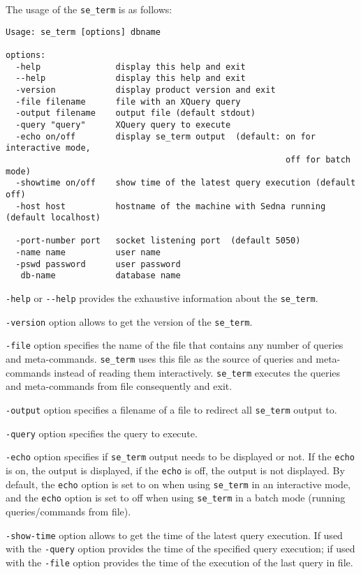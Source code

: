 \documentclass[a4paper,12pt]{article}
\begin{document}
The usage of the \verb!se_term! is as follows:

\begin{verbatim}
Usage: se_term [options] dbname

options:
  -help			      display this help and exit
  --help		      display this help and exit
  -version		      display product version and exit
  -file filename	  file with an XQuery query			  
  -output filename	  output file (default stdout)
  -query "query"	  XQuery query to execute		
  -echo on/off		  display se_term output  (default: on for interactive mode,
                                                        off for batch mode)
  -showtime on/off	  show time of the latest query execution (default off)
  -host host		  hostname of the machine with Sedna running (default localhost)
		
  -port-number port	  socket listening port  (default 5050)
  -name name		  user name 
  -pswd password	  user password 
   db-name		      database name
\end{verbatim}

\verb!-help! or \verb!--help! provides the exhaustive information about the \verb!se_term!.

\verb!-version! option allows to get the version of the \verb!se_term!.

\verb!-file! option specifies the name of the file that contains any number of queries and meta-commands. \verb!se_term! uses this file as the source of queries and meta-commands instead of reading them interactively. \verb!se_term! executes the queries and meta-commands from file consequently and exit.

\verb!-output! option specifies a filename of a file to redirect all \verb!se_term! output to. 

\verb!-query! option specifies the query to execute.

\verb!-echo! option specifies if \verb!se_term! output needs to be displayed or not. If the \verb!echo! is on, the output is displayed, if the \verb!echo! is off, the output is not displayed. By default, the \verb!echo! option is set to on when using \verb!se_term! in an interactive mode, and the \verb!echo! option is set to off when using \verb!se_term! in a batch mode (running queries/commands from file).

\verb!-show-time! option allows to get the time of the latest query execution. If used with the \verb!-query! option provides the time of the specified query execution; if used with the \verb!-file! option provides the time of the execution of the last query in file.
\end{document}
